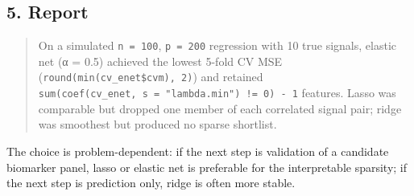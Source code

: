 \documentclass[
]{article}
\newenvironment{Shaded}{\begin{snugshade}}{\end{snugshade}}
\newcommand{\AttributeTok}[1]{\textcolor[rgb]{0.13,0.29,0.53}{#1}}
\newcommand{\DecValTok}[1]{\textcolor[rgb]{0.00,0.00,0.81}{#1}}
\newcommand{\FloatTok}[1]{\textcolor[rgb]{0.00,0.00,0.81}{#1}}
\newcommand{\FunctionTok}[1]{\textcolor[rgb]{0.13,0.29,0.53}{\textbf{#1}}}
\newcommand{\NormalTok}[1]{#1}
\newcommand{\OtherTok}[1]{\textcolor[rgb]{0.56,0.35,0.01}{#1}}
\newcommand{\SpecialCharTok}[1]{\textcolor[rgb]{0.81,0.36,0.00}{\textbf{#1}}}
\newcommand{\StringTok}[1]{\textcolor[rgb]{0.31,0.60,0.02}{#1}}
\begin{document}
\begin{Shaded}
\end{Shaded}

\subsection{5. Report}\label{report}

\begin{quote}
On a simulated \texttt{n\ =\ 100}, \texttt{p\ =\ 200} regression with 10
true signals, elastic net (α = 0.5) achieved the lowest 5-fold CV MSE
(\texttt{round(min(cv\_enet\$cvm),\ 2)}) and retained
\texttt{sum(coef(cv\_enet,\ s\ =\ "lambda.min")\ !=\ 0)\ -\ 1} features.
Lasso was comparable but dropped one member of each correlated signal
pair; ridge was smoothest but produced no sparse shortlist.
\end{quote}

The choice is problem-dependent: if the next step is validation of a
candidate biomarker panel, lasso or elastic net is preferable for the
interpretable sparsity; if the next step is prediction only, ridge is
often more stable.
\end{document}
